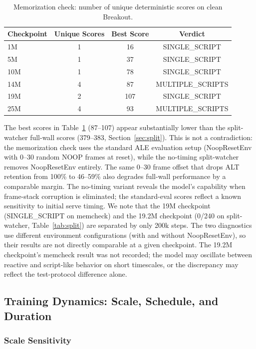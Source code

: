 \documentclass[11pt]{article}
\begin{document}
\begin{table}[h]
\centering
\begin{tabular}{lccc}
\toprule
\textbf{Checkpoint} & \textbf{Unique Scores} & \textbf{Best Score} &
\textbf{Verdict} \\
\midrule
1M  & 1 & 16  & SINGLE\_SCRIPT \\
5M  & 1 & 37  & SINGLE\_SCRIPT \\
10M & 1 & 78  & SINGLE\_SCRIPT \\
14M & 4 & 87  & MULTIPLE\_SCRIPTS \\
19M & 2 & 107 & SINGLE\_SCRIPT \\
25M & 4 & 93  & MULTIPLE\_SCRIPTS \\
\bottomrule
\end{tabular}
\caption{Memorization check: number of unique deterministic scores on clean Breakout.}
\label{tab:memcheck}
\end{table}

The best scores in Table~\ref{tab:memcheck} (87--107) appear substantially lower
than the split-watcher full-wall scores (379--383, Section~\ref{sec:split}). This
is not a contradiction: the memorization check uses the standard ALE evaluation
setup (NoopResetEnv with 0--30 random NOOP frames at reset), while the no-timing
split-watcher removes NoopResetEnv entirely. The same 0--30 frame offset that
drops ALT retention from 100\% to 46--59\% also degrades full-wall performance
by a comparable margin. The no-timing variant reveals the model's capability
when frame-stack corruption is eliminated; the standard-eval scores reflect a
known sensitivity to initial serve timing. We note that the 19M checkpoint
(SINGLE\_SCRIPT on memcheck) and the 19.2M checkpoint (0/240 on split-watcher,
Table~\ref{tab:split}) are separated by only 200k steps. The two diagnostics
use different environment configurations (with and without NoopResetEnv), so
their results are not directly comparable at a given checkpoint. The 19.2M
checkpoint's memcheck result was not recorded; the model may oscillate between
reactive and script-like behavior on short timescales, or the discrepancy may
reflect the test-protocol difference alone.

\subsection{Training Dynamics: Scale, Schedule, and Duration}

\subsubsection{Scale Sensitivity}
\label{sec:scale}
\end{document}
